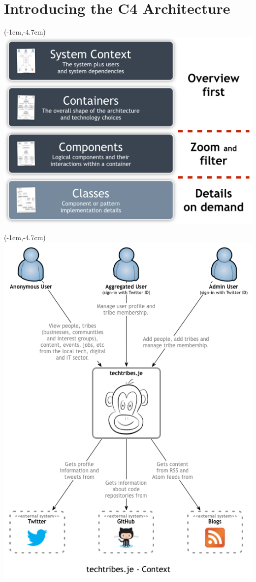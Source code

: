 \documentclass[xelatex,14pt]{beamer}
\begin{document}
\section{Introducing the C4 Architecture}
\begin{frame}[plain]
\begin{textblock*}{0cm}(-1cm,-4.7cm)
	\includegraphics[width=1.0\paperwidth]{c4overview.png}
\end{textblock*}
\end{frame}
\begin{frame}[plain]
\begin{textblock*}{0cm}(-1cm,-4.7cm)
	\includegraphics[width=1.0\paperwidth]{c4systemcontext.png}
\end{textblock*}
\end{frame}
\end{document}
